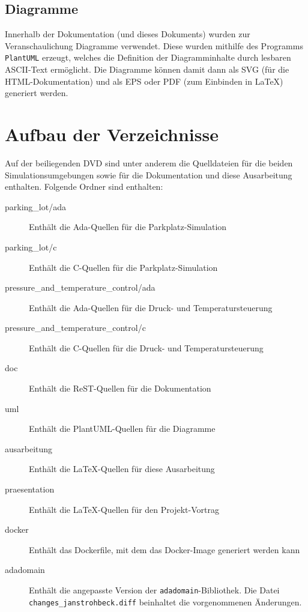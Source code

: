 \documentclass[oneside]{elaboration}
\begin{document}
\subsection{Diagramme}
\label{sec:diagramme}

Innerhalb der Dokumentation (und dieses Dokuments) wurden zur
Veranschaulichung Diagramme verwendet. Diese wurden mithilfe des Programms
\texttt{PlantUML} erzeugt, welches die Definition der Diagramminhalte durch
lesbaren ASCII-Text ermöglicht. Die Diagramme können damit dann als SVG (für die
HTML-Dokumentation) und als EPS oder PDF (zum Einbinden in LaTeX) generiert
werden.

\section{Aufbau der Verzeichnisse}
\label{sec:aufbau_der_verzeichnisse}

Auf der beiliegenden DVD sind unter anderem die Quelldateien für die beiden
Simulationsumgebungen sowie für die Dokumentation und diese Ausarbeitung
enthalten. Folgende Ordner sind enthalten:

\begin{description}
    \item[parking\_lot/ada] Enthält die Ada-Quellen für die Parkplatz-Simulation
    \item[parking\_lot/c] Enthält die C-Quellen für die Parkplatz-Simulation
    \item[pressure\_and\_temperature\_control/ada] Enthält die Ada-Quellen für die Druck- und Temperatursteuerung 
    \item[pressure\_and\_temperature\_control/c] Enthält die C-Quellen für die Druck- und Temperatursteuerung 
    \item[doc] Enthält die ReST-Quellen für die Dokumentation
    \item[uml] Enthält die PlantUML-Quellen für die Diagramme
    \item[ausarbeitung] Enthält die LaTeX-Quellen für diese Ausarbeitung
    \item[praesentation] Enthält die LaTeX-Quellen für den Projekt-Vortrag
    \item[docker] Enthält das Dockerfile, mit dem das Docker-Image generiert
        werden kann
    \item[adadomain] Enthält die angepasste Version der
        \texttt{adadomain}-Bibliothek. Die Datei
        \texttt{changes\_janstrohbeck.diff} beinhaltet die vorgenommenen
        Änderungen.
\end{description}
\end{document}
